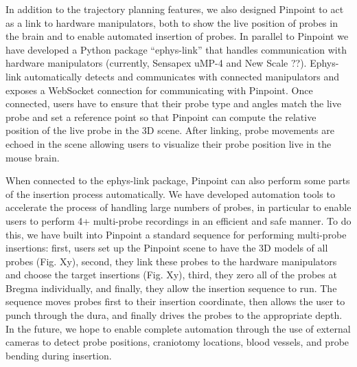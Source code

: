 In addition to the trajectory planning features, we also designed Pinpoint to act as a link to hardware manipulators, both to show the live position of probes in the brain and to enable automated insertion of probes. In parallel to Pinpoint we have developed a Python package ``ephys-link'' that handles communication with hardware manipulators (currently, Sensapex uMP-4 and New Scale ??). Ephys-link automatically detects and communicates with connected manipulators and exposes a WebSocket connection for communicating with Pinpoint. Once connected, users have to ensure that their probe type and angles match the live probe and set a reference point so that Pinpoint can compute the relative position of the live probe in the 3D scene. After linking, probe movements are echoed in the scene allowing users to visualize their probe position live in the mouse brain. 

When connected to the ephys-link package, Pinpoint can also perform some parts of the insertion process automatically. We have developed automation tools to accelerate the process of handling large numbers of probes, in particular to enable users to perform 4+ multi-probe recordings in an efficient and safe manner. To do this, we have built into Pinpoint a standard sequence for performing multi-probe insertions: first, users set up the Pinpoint scene to have the 3D models of all probes (Fig. Xy), second, they link these probes to the hardware manipulators and choose the target insertions (Fig. Xy), third, they zero all of the probes at Bregma individually, and finally, they allow the insertion sequence to run. The sequence moves probes first to their insertion coordinate, then allows the user to punch through the dura, and finally drives the probes to the appropriate depth. In the future, we hope to enable complete automation through the use of external cameras to detect probe positions, craniotomy locations, blood vessels, and probe bending during insertion. 